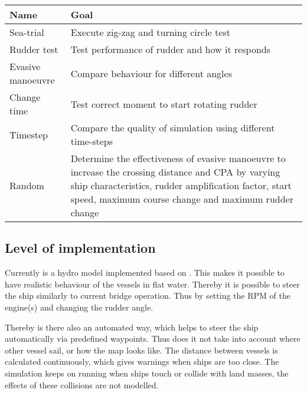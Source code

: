 \begin{table}[p]
	\centering
	\begin{tabular}{p{}|p{}}
		\toprule
		Name & Goal \\
		\midrule
		Sea-trial & Execute zig-zag and turning circle test\\
		Rudder test & Test performance of rudder and how it responds \\
		Evasive manoeuvre & Compare behaviour for different angles \\
		Change time & Test correct moment to start rotating rudder \\
		Timestep & Compare the quality of simulation using different time-steps \\
		Random & Determine the effectiveness of evasive manoeuvre to increase the crossing distance and CPA by varying ship characteristics, rudder amplification factor, start speed, maximum course change and maximum rudder change \\
		\bottomrule
	\end{tabular}
	
	\label{tab:manoeuvring-tests}
\end{table}


\subsection{Level of implementation}
Currently is a hydro model implemented based on \cite{Artyszuk2016}. This makes it possible to have realistic behaviour of the vessels in flat water. Thereby it is possible to steer the ship similarly to current bridge operation. Thus by setting the RPM of the engine(s) and changing the rudder angle. 

Thereby is there also an automated way, which helps to steer the ship automatically via predefined waypoints. Thus does it not take into account where other vessel sail, or how the map looks like. The distance between vessels is calculated continuously, which gives warnings when ships are too close. The simulation keeps on running when ships touch or collide with land masses, the effects of these collisions are not modelled.



